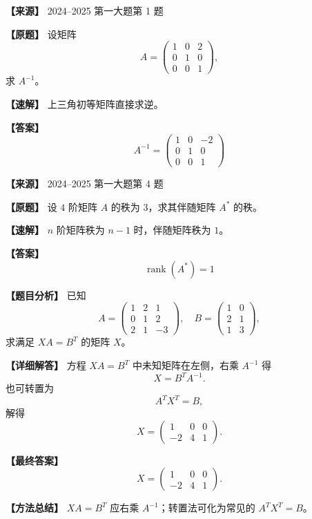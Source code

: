 \documentclass[11pt,a4paper,UTF8]{ctexart}
\newcommand{\rank}{\operatorname{rank}}
\begin{document}
\begin{answerbox}
\textbf{【来源】} 2024--2025 第一大题第 1 题

\textbf{【原题】}
设矩阵
\[
A=\begin{pmatrix}1&0&2\\0&1&0\\0&0&1\end{pmatrix},
\]
求 $A^{-1}$。

\textbf{【速解】}
上三角初等矩阵直接求逆。

\textbf{【答案】}
\[A^{-1}=\begin{pmatrix}1&0&-2\\0&1&0\\0&0&1\end{pmatrix}\]
\end{answerbox}

\begin{answerbox}
\textbf{【来源】} 2024--2025 第一大题第 4 题

\textbf{【原题】}
设 $4$ 阶矩阵 $A$ 的秩为 $3$，求其伴随矩阵 $A^*$ 的秩。

\textbf{【速解】}
$n$ 阶矩阵秩为 $n-1$ 时，伴随矩阵秩为 $1$。

\textbf{【答案】}
\[\rank(A^*)=1\]
\end{answerbox}

\begin{answerbox}
\textbf{【题目分析】} 已知
\[
A=\begin{pmatrix}1&2&1\\0&1&2\\2&1&-3\end{pmatrix},
\quad
B=\begin{pmatrix}1&0\\2&1\\1&3\end{pmatrix},
\]
求满足 $XA=B^T$ 的矩阵 $X$。

\textbf{【详细解答】} 方程 $XA=B^T$ 中未知矩阵在左侧，右乘 $A^{-1}$ 得
\[
X=B^TA^{-1}.
\]
也可转置为
\[
A^TX^T=B,
\]
解得
\[
X=\begin{pmatrix}1&0&0\\-2&4&1\end{pmatrix}.
\]

\textbf{【最终答案】}
\[
X=\begin{pmatrix}1&0&0\\-2&4&1\end{pmatrix}.
\]

\textbf{【方法总结】} $XA=B^T$ 应右乘 $A^{-1}$；转置法可化为常见的 $A^TX^T=B$。
\end{answerbox}
\end{document}
